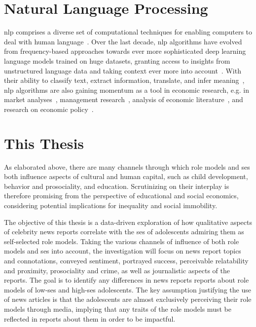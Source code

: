 \section{Natural Language Processing}\label{ch:nlp}
\gls{nlp} comprises a diverse set of computational techniques for enabling computers to deal with human language~\autocite{jurafsky_speech_2008}. Over the last decade, \gls{nlp} algorithms have evolved from frequency-based approaches towards ever more sophisticated deep learning language models trained on huge datasets, granting access to insights from unstructured language data and taking context ever more into account~\autocite{vajjala_practical_2020}. With their ability to classify text, extract information, translate, and infer meaning~\autocite{jurafsky_speech_2008}, \gls{nlp} algorithms are also gaining momentum as a tool in economic research, e.g. in market analyses~\autocite{hoberg_product_2010}, management research~\autocite{kang_natural_2020}, analysis of economic literature~\autocite{kim_keyword_2021,jelveh_detecting_2014,lambert_identifying_2021}, and research on economic policy~\autocite{elshehawy_sascat_2022}.


\section{This Thesis}\label{ch:this_thesis}
As elaborated above, there are many channels through which role models and \gls{ses} both influence aspects of cultural and human capital, such as child development, behavior and prosociality, and education. Scrutinizing on their interplay is therefore promising from the perspective of educational and social economics, considering potential implications for inequality and social immobility.

The objective of this thesis is a data-driven exploration of how qualitative aspects of celebrity news reports correlate with the \gls{ses} of adolescents admiring them as self-selected role models. Taking the various channels of influence of both role models and \gls{ses} into account, the investigation will focus on news report topics and connotations, conveyed sentiment, portrayed success, perceivable relatability and proximity, prosociality and crime, as well as journalistic aspects of the reports. The goal is to identify any differences in news reports reports about role models of low-\gls{ses} and high-\gls{ses} adolescents. The key assumption justifying the use of news articles is that the adolescents are almost exclusively perceiving their role models through media, implying that any traits of the role models must be reflected in reports about them in order to be impactful.

